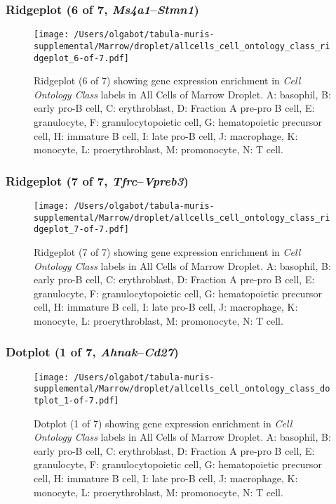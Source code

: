 \clearpage

\subsubsection{Ridgeplot (6 of 7, \emph{Ms4a1}--\emph{Stmn1})}
\begin{figure}[h]
\centering
\texttt{[image: /Users/olgabot/tabula-muris-supplemental/Marrow/droplet/allcells\_cell\_ontology\_class\_ridgeplot\_6-of-7.pdf]}

\caption{ Ridgeplot (6 of 7)  showing gene expression enrichment in \emph{Cell Ontology Class} labels in All Cells of Marrow Droplet. A: basophil, B: early pro-B cell, C: erythroblast, D: Fraction A pre-pro B cell, E: granulocyte, F: granulocytopoietic cell, G: hematopoietic precursor cell, H: immature B cell, I: late pro-B cell, J: macrophage, K: monocyte, L: proerythroblast, M: promonocyte, N: T cell.}
\end{figure}


\clearpage

\subsubsection{Ridgeplot (7 of 7, \emph{Tfrc}--\emph{Vpreb3})}
\begin{figure}[h]
\centering
\texttt{[image: /Users/olgabot/tabula-muris-supplemental/Marrow/droplet/allcells\_cell\_ontology\_class\_ridgeplot\_7-of-7.pdf]}

\caption{ Ridgeplot (7 of 7)  showing gene expression enrichment in \emph{Cell Ontology Class} labels in All Cells of Marrow Droplet. A: basophil, B: early pro-B cell, C: erythroblast, D: Fraction A pre-pro B cell, E: granulocyte, F: granulocytopoietic cell, G: hematopoietic precursor cell, H: immature B cell, I: late pro-B cell, J: macrophage, K: monocyte, L: proerythroblast, M: promonocyte, N: T cell.}
\end{figure}


\clearpage

\subsubsection{Dotplot (1 of 7, \emph{Ahnak}--\emph{Cd27})}
\begin{figure}[h]
\centering
\texttt{[image: /Users/olgabot/tabula-muris-supplemental/Marrow/droplet/allcells\_cell\_ontology\_class\_dotplot\_1-of-7.pdf]}

\caption{ Dotplot (1 of 7)  showing gene expression enrichment in \emph{Cell Ontology Class} labels in All Cells of Marrow Droplet. A: basophil, B: early pro-B cell, C: erythroblast, D: Fraction A pre-pro B cell, E: granulocyte, F: granulocytopoietic cell, G: hematopoietic precursor cell, H: immature B cell, I: late pro-B cell, J: macrophage, K: monocyte, L: proerythroblast, M: promonocyte, N: T cell.}
\end{figure}


